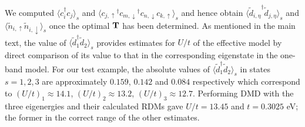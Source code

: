 We computed $\langle c_i^{\dagger} c_j \rangle_s$ and $\langle {c_{j,\uparrow}}^{\dagger} {c_{m,\downarrow}}^{\dagger} c_{n,\downarrow} c_{k,\uparrow} \rangle_{s}$ and hence obtain $\langle {\tilde{d}_{i,\eta}}^{\dagger} \tilde{d}_{j,\eta} \rangle_{s}$ 
and $\langle \tilde{n}_{i,\uparrow} \tilde{n}_{i,\downarrow} \rangle_{s}$ once the optimal ${\bf T}$ has been determined. 
As mentioned in the main text, the value of $\langle \tilde{d}_1^{\dagger} \tilde{d}_2 \rangle_s$ provides estimates for $U/t$ 
of the effective model by direct comparison of its value to that in the corresponding eigenstate in the one-band model. 
For our test example, the absolute values of $\langle \tilde{d}_1^{\dagger} \tilde{d}_2 \rangle_s$ 
in states $s=1,2,3$ are approximately $0.159$, $0.142$ and $0.084$ respectively which correspond to 
$(U/t)_1 \approx 14.1 $, $(U/t)_2 \approx 13.2 $, $(U/t)_3 \approx 12.7 $. Performing DMD with the three eigenergies and their 
calculated RDMs gave $U/t = 13.45 $ and $t = 0.3025 $ eV; the former in the correct range of the other estimates. 
 
